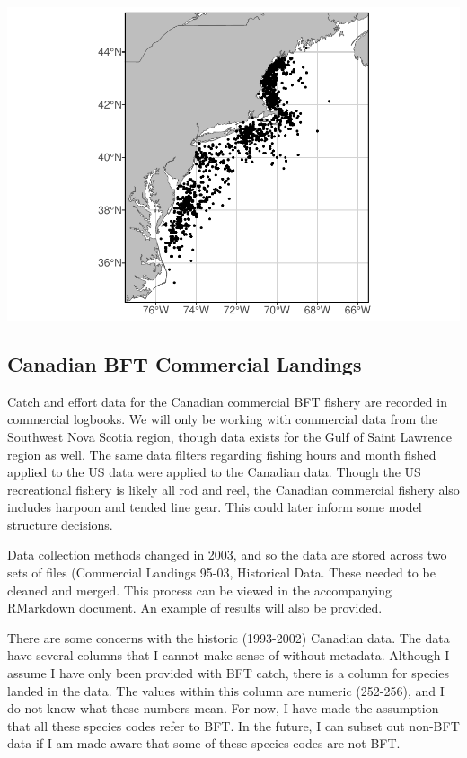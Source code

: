 \documentclass[
]{article}
\let\origfigure\figure
\let\endorigfigure\endfigure
\renewenvironment{figure}[1][2] {
    \expandafter\origfigure\expandafter[H]
} {
    \endorigfigure
}
\begin{document}
\begin{figure}
\centering
\includegraphics{Model_Prelim_Report_files/figure-latex/americanplot-1.pdf}
\caption{\label{fig:americanplot}Fig. 2: Spatial distribution of American recreational catch}
\end{figure}

\hypertarget{canadian-bft-commercial-landings}{%
\subsection{Canadian BFT Commercial Landings}\label{canadian-bft-commercial-landings}}

Catch and effort data for the Canadian commercial BFT fishery are recorded in commercial logbooks. We will only be working with commercial data from the Southwest Nova Scotia region, though data exists for the Gulf of Saint Lawrence region as well. The same data filters regarding fishing hours and month fished applied to the US data were applied to the Canadian data. Though the US recreational fishery is likely all rod and reel, the Canadian commercial fishery also includes harpoon and tended line gear. This could later inform some model structure decisions.

Data collection methods changed in 2003, and so the data are stored across two sets of files (Commercial Landings 95-03, Historical Data. These needed to be cleaned and merged. This process can be viewed in the accompanying RMarkdown document. An example of results will also be provided.

There are some concerns with the historic (1993-2002) Canadian data. The data have several columns that I cannot make sense of without metadata. Although I assume I have only been provided with BFT catch, there is a column for species landed in the data. The values within this column are numeric (252-256), and I do not know what these numbers mean. For now, I have made the assumption that all these species codes refer to BFT. In the future, I can subset out non-BFT data if I am made aware that some of these species codes are not BFT.
\end{document}
